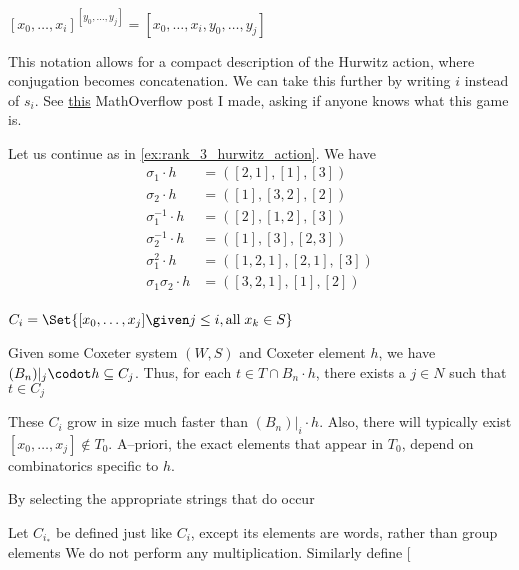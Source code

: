 \begin{remark}
	$[x_0, \ldots, x_i] ^ {[y_0, \ldots , y_j]} = [x_0, \ldots, x_i, y_0, \ldots, y_j]$
\end{remark}

This notation allows for a compact description of the Hurwitz action, where conjugation becomes concatenation.
We can take this further by writing $i$ instead of  $s_i$.
See \href{https://mathoverflow.net/questions/481777/tuple-rearrangement-a-combinatoric-problem-emerging-from-the-hurwitz-action-on}{this} MathOverflow post I made, asking if anyone knows what this game is.

\begin{example}
	Let us continue as in \cref{ex:rank_3_hurwitz_action}.
	We have
	\begin{align*}
		\sigma_1 \cdot h         & = ([2,1],[1],[3])     \\
		\sigma_2 \cdot h         & = ([1],[3,2],[2])     \\
		\sigma_1^{-1} \cdot h    & = ([2],[1,2],[3])     \\
		\sigma_2^{-1} \cdot h    & = ([1],[3],[2,3])     \\
		\sigma_1^2 \cdot h       & = ([1,2,1],[2,1],[3]) \\
		\sigma_1\sigma_2 \cdot h & =  ([3,2,1],[1],[2])  \\
	\end{align*}

\end{example}

\begin{theorem}
	$C_i = \Set{[x_0, \ldots, x_j] \given  j \leq i , \text{all} \; x_k \in S} $
\end{theorem}

\begin{theorem}
	Given some Coxeter system $(W, S)$ and Coxeter element $h$, we have $(B_n)|_j \codot h \subseteq C_j$.
	Thus, for each  $t \in T \cap B_n \cdot h$, there exists a $j \in N$ such that  $t \in C_j$
\end{theorem}

\begin{remark}
	These $C_i$ grow in size much faster than $(B_n)|_i \cdot h$.
	Also, there will typically exist $[x_0, \ldots, x_j] \notin T_0$.
	A--priori, the exact elements that appear in $T_0$, depend on combinatorics specific to $h$.
\end{remark}

\begin{theorem}
	By selecting the appropriate strings that do occur
\end{theorem}

\begin{definition}
	Let $C_i_*$ be defined just like  $C_i$, except its elements are words, rather than group elements
	We do not perform any multiplication.
	Similarly define $[$
\end{definition}


